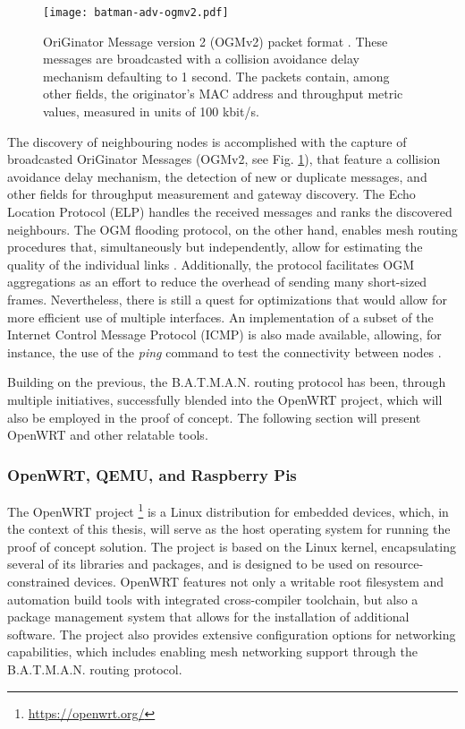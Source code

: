 \begin{figure} [ht]
  \begin{center}
  \texttt{[image: batman-adv-ogmv2.pdf]}
  \caption{OriGinator Message version 2 (OGMv2) packet format \cite{cilfone2019wireless,open-mesh-ogmv2}. These messages are broadcasted with a collision avoidance delay mechanism defaulting to 1 second. The packets contain, among other fields, the originator's MAC address and throughput metric values, measured in units of 100 kbit/s.}
  \label{fig:batman-adv-ogmv2}
  \end{center}
\end{figure}

The discovery of neighbouring nodes is accomplished with the capture of broadcasted OriGinator Messages (OGMv2, see Fig. \ref{fig:batman-adv-ogmv2}), that feature a collision avoidance delay mechanism, the detection of new or duplicate messages, and other fields for throughput measurement and gateway discovery. The Echo Location Protocol (ELP) handles the received messages and ranks the discovered neighbours. The OGM flooding protocol, on the other hand, enables mesh routing procedures that, simultaneously but independently, allow for estimating the quality of the individual links \cite{cilfone2019wireless}. Additionally, the protocol facilitates OGM aggregations as an effort to reduce the overhead of sending many short-sized frames. Nevertheless, there is still a quest for optimizations that would allow for more efficient use of multiple interfaces. An implementation of a subset of the Internet Control Message Protocol (ICMP) is also made available, allowing, for instance, the use of the \emph{ping} command to test the connectivity between nodes \cite{seither2011routing}.

Building on the previous, the B.A.T.M.A.N. routing protocol has been, through multiple initiatives, successfully blended into the OpenWRT project, which will also be employed in the proof of concept. The following section will present OpenWRT and other relatable tools.

\subsubsection{OpenWRT, QEMU, and Raspberry Pis}

The OpenWRT project \footnote{\url{https://openwrt.org/}} is a Linux distribution for embedded devices, which, in the context of this thesis, will serve as the host operating system for running the proof of concept solution. The project is based on the Linux kernel, encapsulating several of its libraries and packages, and is designed to be used on resource-constrained devices. OpenWRT features not only a writable root filesystem and automation build tools with integrated cross-compiler toolchain, but also a package management system that allows for the installation of additional software. The project also provides extensive configuration options for networking capabilities, which includes enabling mesh networking support through the B.A.T.M.A.N. routing protocol. 

